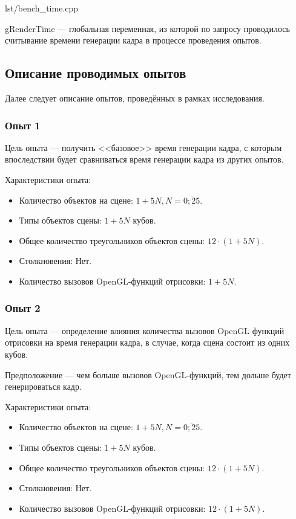 \begin{code}
    \begin{lstinputlisting}[
            label={lst:bench_time},
            caption={Проведение замеров времени},
        ]{lst/bench_time.cpp}
    \end{lstinputlisting}
\end{code}

gRenderTime --- глобальная переменная, из которой по запросу проводилось считывание времени генерации кадра в процессе проведения опытов.

\subsection{Описание проводимых опытов}

Далее следует описание опытов, проведённых в рамках исследования.

\subsubsection{Опыт 1}

Цель опыта --- получить <<базовое>> время генерации кадра, с которым впоследствии будет сравниваться время генерации кадра из других опытов.

Характеристики опыта:
\begin{itemize}
    \item Количество объектов на сцене: $1 + 5 N, N = \overline{0; 25}$.
    \item Типы объектов сцены: $1 + 5 N$ кубов.
    \item Общее количество треугольников объектов сцены: $12 \cdot (1 + 5 N)$.
    \item Столкновения: Нет.
    \item Количество вызовов OpenGL-функций отрисовки: $1 + 5 N$.
\end{itemize}

\subsubsection{Опыт 2}

Цель опыта --- определение влияния количества вызовов OpenGL функций отрисовки на время генерации кадра, в случае, когда сцена состоит из одних кубов.

Предположение --- чем больше вызовов OpenGL-функций, тем дольше будет генерироваться кадр.

Характеристики опыта:
\begin{itemize}
    \item Количество объектов на сцене: $1 + 5 N, N = \overline{0; 25}$.
    \item Типы объектов сцены: $1 + 5 N$ кубов.
    \item Общее количество треугольников объектов сцены: $12 \cdot (1 + 5 N)$.
    \item Столкновения: Нет.
    \item Количество вызовов OpenGL-функций отрисовки: $12 \cdot (1 + 5 N)$.
\end{itemize}

